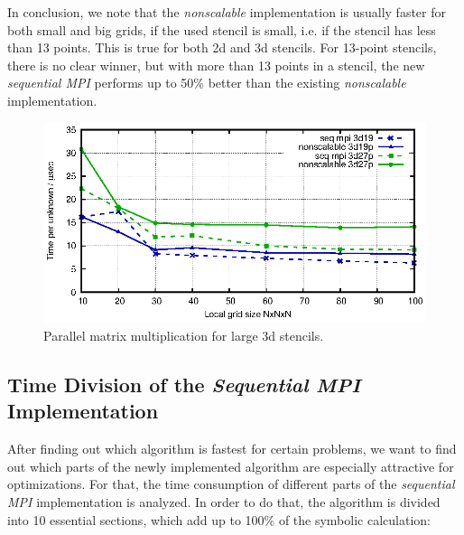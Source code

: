 In conclusion, we note that the \textit{nonscalable} implementation is usually faster for both small and big grids, if the used stencil is small, i.e. if the stencil has less than 13 points. This is true for both 2d and 3d stencils. For 13-point stencils, there is no clear winner, but with more than 13 points in a stencil, the new \textit{sequential MPI} performs up to 50\% better than the existing \textit{nonscalable} implementation.

\begin{figure}[tbp]
	\centering
	\vspace*{-2.5mm}\includegraphics[width=1\textwidth]{times_3dlarge}
	\caption{Parallel matrix multiplication for large 3d stencils.} 
	\label{fig:mat_ex_test_ex2_times_3dlarge}
\end{figure}

\subsection{Time Division of the \textit{Sequential MPI} Implementation}

After finding out which algorithm is fastest for certain problems, we want to find out which parts of the newly implemented algorithm are especially attractive for optimizations. For that, the time consumption of different parts of the \textit{sequential MPI} implementation is analyzed. In order to do that, the algorithm is divided into 10 essential sections, which add up to 100\% of the symbolic calculation:

